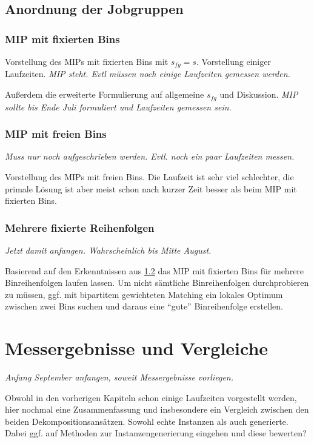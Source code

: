 \documentclass{scrreprt}
\begin{document}
\section{Anordnung der Jobgruppen}
\subsection{MIP mit fixierten Bins}
Vorstellung des MIPs mit fixierten Bins mit $s_{fg}=s$. Vorstellung einiger Laufzeiten. 
\textit{MIP steht. Evtl müssen noch einige Laufzeiten gemessen werden.}

Außerdem die erweiterte Formulierung auf allgemeine $s_{fg}$ und Diskussion.
\textit{MIP sollte bis Ende Juli formuliert und Laufzeiten gemessen sein.}

\subsection{MIP mit freien Bins}
\label{subsec:mipfreibins}
\textit{Muss nur noch aufgeschrieben werden. Evtl. noch ein paar Laufzeiten messen.}

Vorstellung des MIPs mit freien Bins. 
Die Laufzeit ist sehr viel schlechter, die primale Lösung ist aber meist schon nach kurzer Zeit besser als beim MIP mit fixierten Bins.

\subsection{Mehrere fixierte Reihenfolgen}
\textit{Jetzt damit anfangen. Wahrscheinlich bis Mitte August.}

Basierend auf den Erkenntnissen aus \ref{subsec:mipfreibins} das MIP mit fixierten Bins für mehrere Binreihenfolgen laufen lassen.
Um nicht sämtliche Binreihenfolgen durchprobieren zu müssen,
ggf. mit bipartitem gewichteten Matching ein lokales Optimum zwischen zwei Bins suchen und daraus eine "`gute"' Binreihenfolge erstellen.


\chapter{Messergebnisse und Vergleiche}
\textit{Anfang September anfangen, soweit Messergebnisse vorliegen.}

Obwohl in den vorherigen Kapiteln schon einige Laufzeiten vorgestellt werden, hier nochmal eine Zusammenfassung und insbesondere ein Vergleich
zwischen den beiden Dekompositionsansätzen. Sowohl echte Instanzen als auch generierte. 
Dabei ggf. auf Methoden zur Instanzengenerierung eingehen und diese bewerten?
\end{document}
